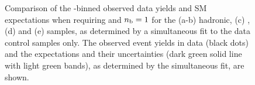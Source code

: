 \begin{figure}[t!]
\begin{center}
{    } 
    \caption{\label{fig:best-fit-control-only-le3j1b} Comparison of the
      \scalht-binned observed data yields and SM expectations when
      requiring \njetlow and $n_{\text{b}} = 1$ for the (a-b) hadronic, (c)
      \mj, (d) \mmj and (e) \gj samples, as determined by a
      simultaneous fit to the data control samples only. The observed
      event yields in data (black dots) and the expectations and their
      uncertainties (dark green solid line with light green bands), as
      determined by the simultaneous fit, are shown. }
  \end{center}
\end{figure}

